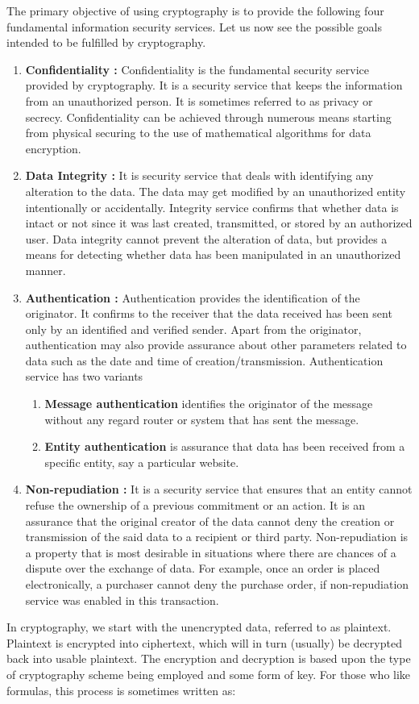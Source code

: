 \documentclass[british]{article}
\begin{document}
The primary objective of using cryptography is to provide the following
four fundamental information security services. Let us now see the
possible goals intended to be fulfilled by cryptography. 
\begin{enumerate}
\item \textbf{Confidentiality : }Confidentiality is the fundamental security
service provided by cryptography. It is a security service that keeps
the information from an unauthorized person. It is sometimes referred
to as privacy or secrecy. Confidentiality can be achieved through
numerous means starting from physical securing to the use of mathematical
algorithms for data encryption. 
\item \textbf{Data Integrity :} It is security service that deals with identifying
any alteration to the data. The data may get modified by an unauthorized
entity intentionally or accidentally. Integrity service confirms that
whether data is intact or not since it was last created, transmitted,
or stored by an authorized user. Data integrity cannot prevent the
alteration of data, but provides a means for detecting whether data
has been manipulated in an unauthorized manner. 
\item \textbf{Authentication : }Authentication provides the identification
of the originator. It confirms to the receiver that the data received
has been sent only by an identified and verified sender. Apart from
the originator, authentication may also provide assurance about other
parameters related to data such as the date and time of creation/transmission.
Authentication service has two variants \textminus{} 
\begin{enumerate}
\item \textbf{Message authentication} identifies the originator of the message
without any regard router or system that has sent the message. 
\item \textbf{Entity authentication} is assurance that data has been received
from a specific entity, say a particular website. 
\end{enumerate}
\item \textbf{Non-repudiation : }It is a security service that ensures that
an entity cannot refuse the ownership of a previous commitment or
an action. It is an assurance that the original creator of the data
cannot deny the creation or transmission of the said data to a recipient
or third party. Non-repudiation is a property that is most desirable
in situations where there are chances of a dispute over the exchange
of data. For example, once an order is placed electronically, a purchaser
cannot deny the purchase order, if non-repudiation service was enabled
in this transaction. 
\end{enumerate}
In cryptography, we start with the unencrypted data, referred to as
plaintext. Plaintext is encrypted into ciphertext, which will in turn
(usually) be decrypted back into usable plaintext. The encryption
and decryption is based upon the type of cryptography scheme being
employed and some form of key. For those who like formulas, this process
is sometimes written as:
\end{document}
